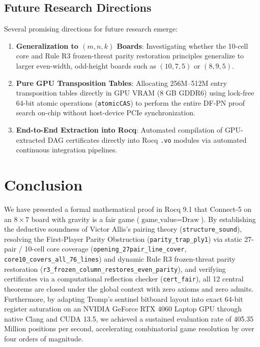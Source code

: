 \documentclass[11pt,reqno]{amsart}
\theoremstyle{plain}
\theoremstyle{definition}
\theoremstyle{remark}
\begin{document}
\subsection{Future Research Directions}
Several promising directions for future research emerge:
\begin{enumerate}
    \item \textbf{Generalization to $(m, n, k)$ Boards}: Investigating whether the 10-cell core and Rule R3 frozen-threat parity restoration principles generalize to larger even-width, odd-height boards such as $(10, 7, 5)$ or $(8, 9, 5)$.
    \item \textbf{Pure GPU Transposition Tables}: Allocating 256M--512M entry transposition tables directly in GPU VRAM (8 GB GDDR6) using lock-free 64-bit atomic operations (\texttt{atomicCAS}) to perform the entire DF-PN proof search on-chip without host-device PCIe synchronization.
    \item \textbf{End-to-End Extraction into Rocq}: Automated compilation of GPU-extracted DAG certificates directly into Rocq \texttt{.vo} modules via automated continuous integration pipelines.
\end{enumerate}

\section{Conclusion}

We have presented a formal mathematical proof in Rocq 9.1 that Connect-5 on an $8 \times 7$ board with gravity is a fair game ($\text{game\_value} = \text{Draw}$). By establishing the deductive soundness of Victor Allis's pairing theory (\texttt{structure\_sound}), resolving the First-Player Parity Obstruction (\texttt{parity\_trap\_ply1}) via static 27-pair / 10-cell core coverage (\texttt{opening\_27pair\_line\_cover}, \texttt{core10\_covers\_all\_76\_lines}) and dynamic Rule R3 frozen-threat parity restoration (\texttt{r3\_frozen\_column\_restores\_even\_parity}), and verifying certificates via a computational reflection checker (\texttt{cert\_fair}), all 12 central theorems are closed under the global context with zero axioms and zero admits. Furthermore, by adapting Tromp's sentinel bitboard layout into exact 64-bit register saturation on an NVIDIA GeForce RTX 4060 Laptop GPU through native Clang and CUDA 13.5, we achieved a sustained evaluation rate of 405.35 Million positions per second, accelerating combinatorial game resolution by over four orders of magnitude.
\end{document}
